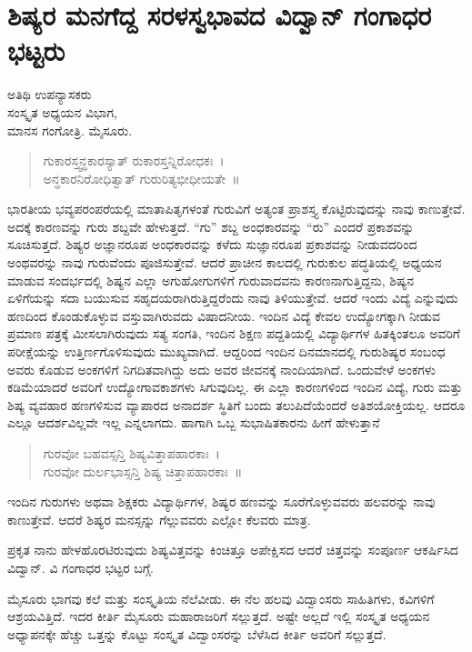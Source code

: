 \chapter{ಶಿಷ್ಯರ ಮನಗೆದ್ದ ಸರಳಸ್ವಭಾವದ ವಿದ್ವಾನ್ ಗಂಗಾಧರ ಭಟ್ಟರು}

\begin{center}
\smallskip
ಅತಿಥಿ ಉಪನ್ಯಾಸಕರು\\
ಸಂಸ್ಕೃತ ಅಧ್ಯಯನ ವಿಭಾಗ,\\
ಮಾನಸ ಗಂಗೋತ್ರಿ. ಮೈಸೂರು.
\addrule
\end{center}
\begin{verse}
ಗುಕಾರಸ್ತ್ವನ್ಧಕಾರಸ್ಯಾತ್ ರುಕಾರಸ್ತನ್ನಿರೋಧಕಃ~।\\
ಅನ್ಧಕಾರನಿರೋಧಿತ್ವಾತ್ ಗುರುರಿತ್ಯಭೀಧೀಯತೇ~॥
\end{verse}
ಭಾರತೀಯ ಭವ್ಯಪರಂಪರೆಯಲ್ಲಿ ಮಾತಾಪಿತೃಗಳಂತೆ ಗುರುವಿಗೆ ಅತ್ಯಂತ ಪ್ರಾಶಸ್ತ್ಯ ಕೊಟ್ಟಿರುವುದನ್ನು ನಾವು ಕಾಣುತ್ತೇವೆ. ಅದಕ್ಕೆ ಕಾರಣವನ್ನು ಗುರು ಶಬ್ದವೇ ಹೇಳುತ್ತದೆ. “ಗು” ಶಬ್ದ ಅಂಧಕಾರವನ್ನು “ರು” ಎಂದರೆ ಪ್ರಕಾಶವನ್ನು ಸೂಚಿಸುತ್ತದೆ. ಶಿಷ್ಯರ ಅಜ್ಞಾನರೂಪ ಅಂಧಕಾರವನ್ನು ಕಳೆದು ಸುಜ್ಞಾನರೂಪ ಪ್ರಕಾಶವನ್ನು ನೀಡುವದರಿಂದ ಅಂಥವರನ್ನು ನಾವು ಗುರುವೆಂದು ಪೂಜಿಸುತ್ತೇವೆ. ಆದರೆ ಪ್ರಾಚೀನ ಕಾಲದಲ್ಲಿ ಗುರುಕುಲ ಪದ್ಧತಿಯಲ್ಲಿ ಅಧ್ಯಯನ ಮಾಡುವ ಸಂದರ್ಭದಲ್ಲಿ ಶಿಷ್ಯನ ಎಲ್ಲಾ ಅಗುಹೋಗುಗಳಿಗೆ ಗುರುವಾದವನು ಕಾರಣನಾಗುತ್ತಿದ್ದನು, ಶಿಷ್ಯನ ಏಳಿಗೆಯನ್ನು ಸದಾ ಬಯುಸುವ ಸಹೃದಯರಾಗಿರುತ್ತಿದ್ದರೆಂದು ನಾವು ತಿಳಿಯುತ್ತೇವೆ. ಆದರೆ ಇಂದು ವಿದ್ಯೆ ಎನ್ನುವುದು ಹಣದಿಂದ ಕೊಂಡುಕೊಳ್ಳುವ ವಸ್ತುವಾಗಿರುವದು ವಿಷಾದನೀಯ. ಇಂದಿನ ವಿದ್ಯೆ ಕೇವಲ ಉದ್ಯೋಗಕ್ಕಾಗಿ ನೀಡುವ ಪ್ರಮಾಣ ಪತ್ರಕ್ಕೆ ಮೀಸಲಾಗಿರುವುದು ಸತ್ಯ ಸಂಗತಿ, ಇಂದಿನ ಶಿಕ್ಷಣ ಪದ್ದತಿಯಲ್ಲಿ ವಿದ್ಯಾರ್ಥಿಗಳ ಹಿತಕ್ಕಿಂತಲೂ ಅವರಿಗೆ ಪರೀಕ್ಷೆಯನ್ನು ಉತ್ತಿರ್ಣಗೊಳಿಸುವುದು ಮುಖ್ಯವಾಗಿದೆ. ಆದ್ದರಿಂದ ಇಂದಿನ ದಿನಮಾನದಲ್ಲಿ ಗುರುಶಿಷ್ಯರ ಸಂಬಂಧ ಅವರು ಕೊಡುವ ಅಂಕಗಳಿಗೆ ನಿಗದಿತವಾಗಿದ್ದು ಅದು ಅವರ ಜೀವನಕ್ಕೆ ನಾಂದಿಯಾಗಿದೆ. ಒಂದುವೇಳೆ ಅಂಕಗಳು ಕಡಿಮೆಯಾದರೆ ಅವರಿಗೆ ಉದ್ಯೋಗಾವಕಾಶಗಳು ಸಿಗುವುದಿಲ್ಲ. ಈ ಎಲ್ಲಾ ಕಾರಣಗಳಿಂದ ಇಂದಿನ ವಿದ್ಯೆ, ಗುರು ಮತ್ತು ಶಿಷ್ಯ ವ್ಯವಹಾರ ಹಣಗಳಿಸುವ ವ್ಯಾಪಾರದ ಅನಾದರ್ಶ ಸ್ಥಿತಿಗೆ ಬಂದು ತಲುಪಿದೆಯೆಂದರೆ ಅತಿಶಯೋಕ್ತಿಯಲ್ಲ. ಆದರೂ ಎಲ್ಲೂ ಆದರ್ಶವಿಲ್ಲವೇ ಇಲ್ಲ ಎನ್ನಲಾಗದು. ಹಾಗಾಗಿ ಒಬ್ಬ ಸುಭಾಷಿತಕಾರನು ಹೀಗೆ ಹೇಳುತ್ತಾನೆ 
\begin{verse}
ಗುರವೋ ಬಹವಸ್ಸನ್ತಿ ಶಿಷ್ಯವಿತ್ತಾಪಹಾರಕಾಃ~।\\
ಗುರವೋ ದುರ್ಲಭಾಸ್ಸನ್ತಿ ಶಿಷ್ಯ ಚಿತ್ತಾಪಹಾರಕಾಃ~॥
\end{verse}
ಇಂದಿನ ಗುರುಗಳು ಅಥವಾ ಶಿಕ್ಷಕರು ವಿದ್ಯಾರ್ಥಿಗಳ, ಶಿಷ್ಯರ ಹಣವನ್ನು ಸೂರೆಗೊಳ್ಳುವವರು ಹಲವರನ್ನು ನಾವು ಕಾಣುತ್ತೇವೆ. ಆದರೆ ಶಿಷ್ಯರ ಮನಸ್ಸನ್ನು ಗೆಲ್ಲುವವರು ಎಲ್ಲೋ ಕೆಲವರು ಮಾತ್ರ.

ಪ್ರಕೃತ ನಾನು ಹೇಳಹೊರಟಿರುವುದು ಶಿಷ್ಯವಿತ್ತವನ್ನು ಕಿಂಚಿತ್ತೂ ಅಪೇಕ್ಷಿಸದ ಆದರೆ ಚಿತ್ತವನ್ನು ಸಂಪೂರ್ಣ ಆಕರ್ಷಿಸಿದ ವಿದ್ವಾನ್. ವಿ ಗಂಗಾಧರ ಭಟ್ಟರ ಬಗ್ಗೆ.

ಮೈಸೂರು ಭಾಗವು ಕಲೆ ಮತ್ತು ಸಂಸ್ಕೃತಿಯ ನೆಲೆವೀಡು. ಈ ನೆಲ ಹಲವು ವಿದ್ವಾಂಸರು ಸಾಹಿತಿಗಳು, ಕವಿಗಳಿಗೆ ಆಶ್ರಯವಿತ್ತಿದೆ. ಇದರ ಕೀರ್ತಿ ಮೈಸೂರು ಮಹಾರಾಜರಿಗೆ ಸಲ್ಲುತ್ತದೆ. ಅಷ್ಟೇ ಅಲ್ಲದೆ ಇಲ್ಲಿ ಸಂಸ್ಕೃತ ಅಧ್ಯಯನ ಅಧ್ಯಾಪನಕ್ಕೇ ಹೆಚ್ಚು ಒತ್ತನ್ನು ಕೊಟ್ಟು ಸಂಸ್ಕೃತ ವಿದ್ವಾಂಸರನ್ನು ಬೆಳೆಸಿದ ಕೀರ್ತಿ ಅವರಿಗೆ ಸಲ್ಲುತ್ತದೆ.

